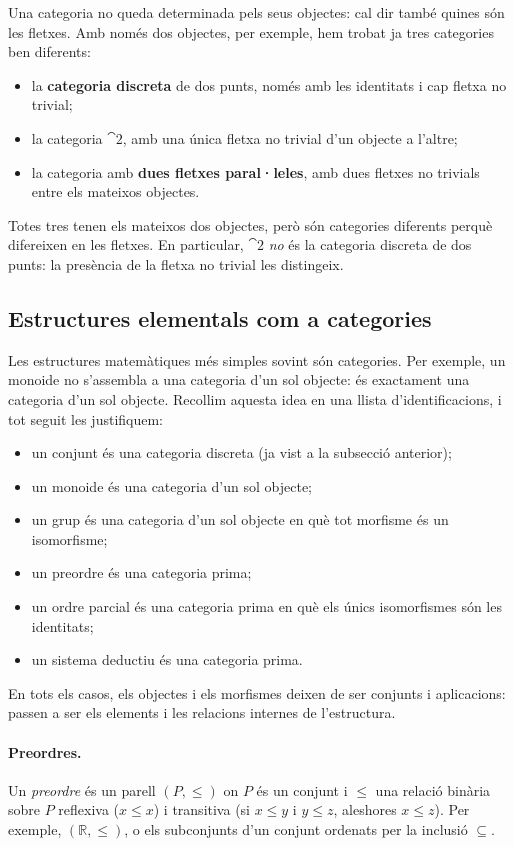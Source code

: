 \begin{observacio}
Una categoria no queda determinada pels seus objectes: cal dir també quines són les fletxes. Amb només dos objectes, per exemple, hem trobat ja tres categories ben diferents:
\begin{itemize}
\item la \textbf{categoria discreta} de dos punts, només amb les identitats i cap fletxa no trivial;
\item la categoria $\cat{2}$, amb una única fletxa no trivial d'un objecte a l'altre;
\item la categoria amb \textbf{dues fletxes paral·leles}, amb dues fletxes no trivials entre els mateixos objectes.
\end{itemize}
Totes tres tenen els mateixos dos objectes, però són categories diferents perquè difereixen en les fletxes. En particular, $\cat{2}$ \emph{no} és la categoria discreta de dos punts: la presència de la fletxa no trivial les distingeix.
\end{observacio}

\subsection{Estructures elementals com a categories}\label{subsec:elementals}

Les estructures matemàtiques més simples sovint són categories. Per exemple, un monoide no s'assembla a una categoria d'un sol objecte: és exactament una categoria d'un sol objecte. Recollim aquesta idea en una llista d'identificacions, i tot seguit les justifiquem:
\begin{itemize}
\item un conjunt és una categoria discreta (ja vist a la subsecció anterior);
\item un monoide és una categoria d'un sol objecte;
\item un grup és una categoria d'un sol objecte en què tot morfisme és un isomorfisme;
\item un preordre és una categoria prima;
\item un ordre parcial és una categoria prima en què els únics isomorfismes són les identitats;
\item un sistema deductiu és una categoria prima.
\end{itemize}
En tots els casos, els objectes i els morfismes deixen de ser conjunts i aplicacions: passen a ser els elements i les relacions internes de l'estructura.

\paragraph{Preordres.}
Un \emph{preordre} és un parell $(P,\le)$ on $P$ és un conjunt i $\le$ una relació binària sobre $P$ reflexiva ($x\le x$) i transitiva (si $x\le y$ i $y\le z$, aleshores $x\le z$). Per exemple, $(\mathbb{R},\le)$, o els subconjunts d'un conjunt ordenats per la inclusió $\subseteq$.

